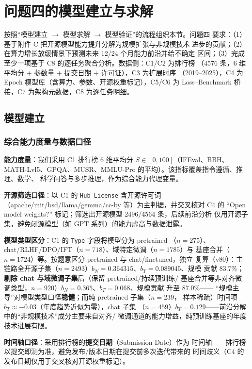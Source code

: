 \section{问题四的模型建立与求解}

按照``模型建立 $\to$ 模型求解 $\to$ 模型验证''的流程组织本节。问题四
要求：（1）基于附件 C 把开源模型能力提升分解为规模扩张与非规模技术
进步的贡献；（2）在算力增长放缓情景下预测未来 12/24 个月能力前沿并给不确定
区间；（3）完成至少一项基于 C8 的逐任务聚合分析。数据侧：C1/C2 为排行榜
（4576 条，6 维平均分 + 参数量 + 提交日期 + 许可证），C3 为扩展时序
（2019--2025），C4 为 Epoch 模型库\cite{refEpoch}（含算力、参数、开源权重标记），C5/C6
为 Loss--Benchmark 桥接，C7 为架构元数据，C8 为逐任务明细。

\subsection{模型建立}

\subsubsection{综合能力度量与数据口径}

\textbf{能力度量}：我们采用 C1 排行榜 6 维平均分 $S\in[0,100]$（IFEval、BBH、
MATH-Lvl5、GPQA、MUSR、MMLU-Pro 的平均）。该指标覆盖指令遵循、推理、数学、
科学问答与多步推理，作为综合能力代理变量。

\textbf{开源筛选口径}：以 C1 的 \texttt{Hub License} 含开源许可词
（apache/mit/bsd/llama/gemma/cc-by 等）为主判据，并交叉核对 C4 的
``Open model weights?'' 标记；筛选出开源模型 2496/4564 条，后续前沿分析
仅用开源子集，避免闭源模型（如 GPT 系列）的能力虚高与数据泄露。

\textbf{模型类型区分}：C1 的 \texttt{Type} 字段将模型分为 pretrained
（$n=275$）、chat/RLHF/DPO/IFT（$n=718$）、域特定微调（$n=1785$）与
基座合并（$n=1724$）等。按题意区分 pretrained 与 chat/finetuned，独立
复算（v80）：主链路全开源子集（$n=2493$）$b_N=0.364315$、$b_T=0.089045$、规模
贡献 83.7\%；\textbf{剔除 chat 与域微调子集}后（保留 pretrained/持续预训练/
基座合并等非对齐微调类型，$n=920$）$b_N=0.365$、$b_T=0.068$、规模贡献
升至 87.0\%——
``规模主导''对模型类型口径\textbf{稳健}；而纯 pretrained 子集（$n=239$，
样本稀疏）时间项 $b_T\approx-0.03$（年度趋势近似为零），chat 子集
（$n=459$）$b_T=0.129$——前沿分解中的``非规模技术''成分主要来自对齐/
微调通道的能力增益，纯预训练基座的年度技术进展有限。

\textbf{时间轴口径}：采用排行榜的\textbf{提交日期}（Submission Date）作为
时间轴——排行榜以提交即测为准，避免发布/版本日期在提交前多次迭代带来的
时间歧义（C4 的发布日期仅用于交叉核对开源权重标记）。


